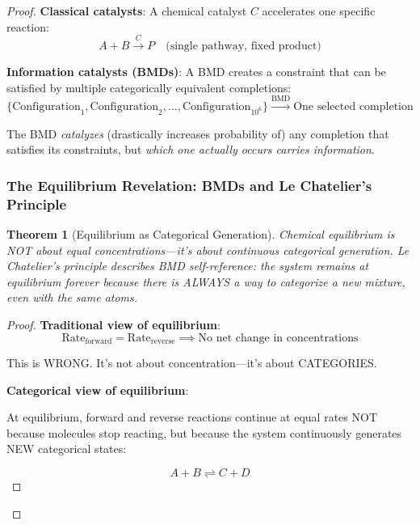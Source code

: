 \documentclass[11pt,a4paper]{article}
\newtheorem{theorem}{Theorem}
\begin{document}
\begin{proof}
\textbf{Classical catalysts}: A chemical catalyst $C$ accelerates one specific reaction:
\begin{equation}
A + B \xrightarrow{C} P \quad \text{(single pathway, fixed product)}
\end{equation}

\textbf{Information catalysts (BMDs)}: A BMD creates a constraint that can be satisfied by multiple categorically equivalent completions:
\begin{equation}
\{\text{Configuration}_1, \text{Configuration}_2, \ldots, \text{Configuration}_{10^6}\} \xrightarrow{\text{BMD}} \text{One selected completion}
\end{equation}

The BMD \textit{catalyzes} (drastically increases probability of) any completion that satisfies its constraints, but \textit{which one actually occurs carries information}.

\subsubsection{The Equilibrium Revelation: BMDs and Le Chatelier's Principle}

\begin{theorem}[Equilibrium as Categorical Generation]
\label{thm:equilibrium_categorical}
Chemical equilibrium is NOT about equal concentrations—it's about continuous categorical generation. Le Chatelier's principle describes BMD self-reference: the system remains at equilibrium forever because there is ALWAYS a way to categorize a new mixture, even with the same atoms.
\end{theorem}

\begin{proof}
\textbf{Traditional view of equilibrium}:
\begin{equation}
\text{Rate}_{\text{forward}} = \text{Rate}_{\text{reverse}} \implies \text{No net change in concentrations}
\end{equation}

This is WRONG. It's not about concentration—it's about CATEGORIES.

\textbf{Categorical view of equilibrium}:

At equilibrium, forward and reverse reactions continue at equal rates NOT because molecules stop reacting, but because the system continuously generates NEW categorical states:

\begin{equation}
A + B \rightleftharpoons C + D
\end{equation}


\end{proof}
\end{proof}
\end{document}
